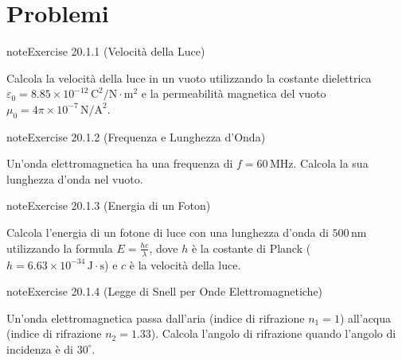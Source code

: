 \documentclass[letterpaper,10pt,italian]{jupyterBook}
\begin{document}
\section{Problemi}
\label{\detokenize{ch/electromagnetism/em-waves-problems:problemi}}\label{\detokenize{ch/electromagnetism/em-waves-problems:physics-hs-electromagnetism-em-waves-problems}}\label{\detokenize{ch/electromagnetism/em-waves-problems::doc}} \label{exercise:ch/electromagnetism/em-waves-problems-exercise-0}

\begin{sphinxadmonition}{note}{Exercise 20.1.1 (Velocità della Luce)}



\sphinxAtStartPar
Calcola la velocità della luce in un vuoto utilizzando la costante dielettrica \(\varepsilon_0 = 8.85 \times 10^{-12} \, \text{C}^2/\text{N} \cdot \text{m}^2\) e la permeabilità magnetica del vuoto \(\mu_0 = 4\pi \times 10^{-7} \, \text{N}/\text{A}^2\).
\end{sphinxadmonition}
 \label{exercise:ch/electromagnetism/em-waves-problems-exercise-1}

\begin{sphinxadmonition}{note}{Exercise 20.1.2 (Frequenza e Lunghezza d’Onda)}



\sphinxAtStartPar
Un’onda elettromagnetica ha una frequenza di \(f = 60 \, \text{MHz}\). Calcola la sua lunghezza d’onda nel vuoto.
\end{sphinxadmonition}
 \label{exercise:ch/electromagnetism/em-waves-problems-exercise-2}

\begin{sphinxadmonition}{note}{Exercise 20.1.3 (Energia di un Foton)}



\sphinxAtStartPar
Calcola l’energia di un fotone di luce con una lunghezza d’onda di \(500 \, \text{nm}\) utilizzando la formula \(E = \frac{h c}{\lambda}\), dove \(h\) è la costante di Planck (\(h = 6.63 \times 10^{-34} \, \text{J} \cdot \text{s}\)) e \(c\) è la velocità della luce.
\end{sphinxadmonition}
 \label{exercise:ch/electromagnetism/em-waves-problems-exercise-3}

\begin{sphinxadmonition}{note}{Exercise 20.1.4 (Legge di Snell per Onde Elettromagnetiche)}



\sphinxAtStartPar
Un’onda elettromagnetica passa dall’aria (indice di rifrazione \(n_1 = 1\)) all’acqua (indice di rifrazione \(n_2 = 1.33\)). Calcola l’angolo di rifrazione quando l’angolo di incidenza è di \(30^\circ\).
\end{sphinxadmonition}
 \label{exercise:ch/electromagnetism/em-waves-problems-exercise-4}
\end{document}
